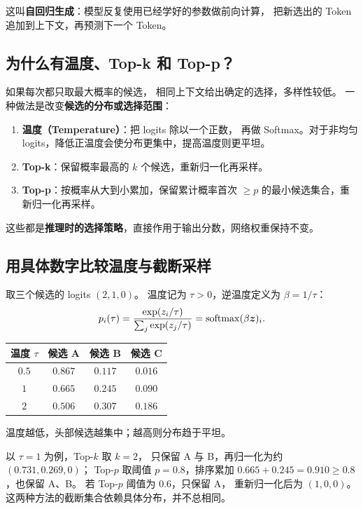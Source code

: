 这叫\textbf{自回归生成}：模型反复使用已经学好的参数做前向计算，
把新选出的 Token 追加到上下文，再预测下一个 Token。

\subsection{为什么有温度、Top-k 和 Top-p？}
\label{concept:sampling}

如果每次都只取最大概率的候选，
相同上下文给出确定的选择，多样性较低。
一种做法是改变\textbf{候选的分布或选择范围}：
\begin{enumerate}
\item \textbf{温度（Temperature）}：把 logits 除以一个正数，
再做 Softmax。对于非均匀 logits，降低正温度会使分布更集中，提高温度则更平坦。
\item \textbf{Top-k}：保留概率最高的 $k$ 个候选，重新归一化再采样。
\item \textbf{Top-p}：按概率从大到小累加，保留累计概率首次 $\ge p$ 的最小候选集合，重新归一化再采样。
\end{enumerate}
这些都是\textbf{推理时的选择策略}，直接作用于输出分数，网络权重保持不变。

\subsection{用具体数字比较温度与截断采样}

取三个候选的 logits $(2,1,0)$。
温度记为 $\tau>0$，逆温度定义为 $\beta=1/\tau$：
\[
p_i(\tau)=\frac{\exp(z_i/\tau)}{\sum_j\exp(z_j/\tau)}
=\operatorname{softmax}(\beta\boldsymbol{z})_i.
\]
\begin{center}\small
{}
\begin{tabular}{@{}cccc@{}}\toprule
温度 $\tau$ & 候选 A & 候选 B & 候选 C\\\midrule
$0.5$ & $0.867$ & $0.117$ & $0.016$\\
$1$ & $0.665$ & $0.245$ & $0.090$\\
$2$ & $0.506$ & $0.307$ & $0.186$\\\bottomrule
\end{tabular}
\end{center}
温度越低，头部候选越集中；越高则分布趋于平坦。

以 $\tau=1$ 为例，Top-$k$ 取 $k=2$，
只保留 A 与 B，再归一化为约 $(0.731,0.269,0)$；
Top-$p$ 取阈值 $p=0.8$，排序累加
$0.665+0.245=0.910\ge0.8$，也保留 A、B。
若 Top-$p$ 阈值为 $0.6$，只保留 A，
重新归一化后为 $(1,0,0)$。
这两种方法的截断集合依赖具体分布，并不总相同。

